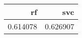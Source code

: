\begin{tabular}{rr}
\toprule
       rf &       svc \\
\midrule
 0.614078 &  0.626907 \\
\bottomrule
\end{tabular}
